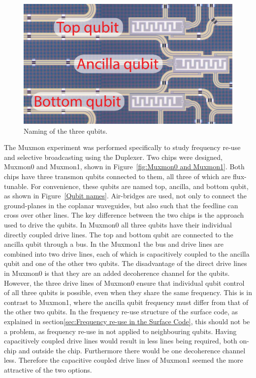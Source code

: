       \begin{figure}
        \begin{center}
        \vspace{-30pt}
          \includegraphics[width=\textwidth]{../Figures/Qubit names.jpg}
        \end{center}
        \vspace{-20 pt}
        \caption{Naming of the three qubits.}
        \label{fig:Qubit names}
      \end{figure}

      The Muxmon experiment was performed specifically to study frequency re-use and selective broadcasting using the Duplexer. Two chips were designed, Muxmon0 and Muxmon1, shown in Figure~\ref{fig:Muxmon0 and Muxmon1}. Both chips have three transmon qubits connected to them, all three of which are flux-tunable. For convenience, these qubits are named top, ancilla, and bottom qubit, as shown in Figure~\ref{Qubit names}. Air-bridges are used, not only to connect the ground-planes in the coplanar waveguides, but also such that the feedline can cross over other lines. The key difference between the two chips is the approach used to drive the qubits. In Muxmon0 all three qubits have their individual directly coupled drive lines. The top and bottom qubit are connected to the ancilla qubit through a bus. In the Muxmon1 the bus and drive lines are combined into two drive lines, each of which is capacitively coupled to the ancilla qubit and one of the other two qubits. The disadvantage of the direct drive lines in Muxmon0 is that they are an added decoherence channel for the qubits. However, the three drive lines of Muxmon0 ensure that individual qubit control of all three qubits is possible, even when they share the same frequency. This is in contrast to Muxmon1, where the ancilla qubit frequency must differ from that of the other two qubits. In the frequency re-use structure of the surface code, as explained in section\ref{sec:Frequency re-use in the Surface Code}, this should not be a problem, as frequency re-use in not applied to neighbouring qubits. Having capacitively coupled drive lines would result in less lines being required, both on-chip and outside the chip. Furthermore there would be one decoherence channel less. Therefore the capacitive coupled drive lines of Muxmon1 seemed the more attractive of the two options.

